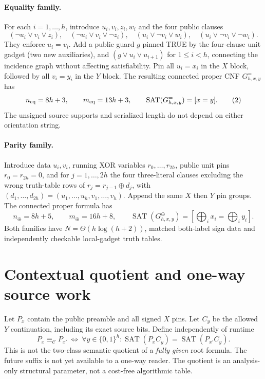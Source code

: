 \documentclass[11pt]{article}
\newcommand{\SAT}{\operatorname{SAT}}
\begin{document}
\paragraph{Equality family.}
For each $i=1,\ldots,h$, introduce $u_i,v_i,z_i,w_i$ and the four public clauses
\[
(\neg u_i\vee v_i\vee z_i),\quad
(\neg u_i\vee v_i\vee\neg z_i),\quad
(u_i\vee\neg v_i\vee w_i),\quad
(u_i\vee\neg v_i\vee\neg w_i).
\]
They enforce $u_i=v_i$. Add a public guard $g$ pinned TRUE by the four-clause unit gadget (two new auxiliaries), and $(g\vee u_i\vee u_{i+1})$ for $1\le i<h$, connecting the incidence graph without affecting satisfiability. Pin all $u_i=x_i$ in the $X$ block, followed by all $v_i=y_i$ in the $Y$ block. The resulting connected proper CNF $G^=_{h,x,y}$ has
\[
 n_{\rm eq}=8h+3,\qquad m_{\rm eq}=13h+3,\qquad
 \SAT(G^=_{h,x,y})=[x=y].
\tag{2}
\]
The unsigned source supports and serialized length do not depend on either orientation string.

\paragraph{Parity family.}
Introduce data $u_i,v_i$, running XOR variables $r_0,\ldots,r_{2h}$, public unit pins $r_0=r_{2h}=0$, and for $j=1,\ldots,2h$ the four three-literal clauses excluding the wrong truth-table rows of $r_j=r_{j-1}\oplus d_j$, with $(d_1,\ldots,d_{2h})=(u_1,\ldots,u_h,v_1,\ldots,v_h)$. Append the same $X$ then $Y$ pin groups. The connected proper formula has
\[
 n_{\oplus}=8h+5,\qquad m_{\oplus}=16h+8,\qquad
 \SAT(G^\oplus_{h,x,y})=
 [\bigoplus_i x_i=\bigoplus_i y_i].
\tag{3}
\]
Both families have $N=\Theta(h\log(h+2))$, matched both-label sign data and independently checkable local-gadget truth tables.

\section{Contextual quotient and one-way source work}
Let $P_x$ contain the public preamble and all signed $X$ pins. Let $C_y$ be the allowed $Y$ continuation, including its exact source bits. Define independently of runtime
\[
 P_x\equiv_{\mathcal C}P_{x'}\ \iff\
 \forall y\in\{0,1\}^h:
 \SAT(P_xC_y)=\SAT(P_{x'}C_y).
\tag{4}
\]
This is not the two-class semantic quotient of a \emph{fully given} root formula. The future suffix is not yet available to a one-way reader. The quotient is an analysis-only structural parameter, not a cost-free algorithmic table.
\end{document}
